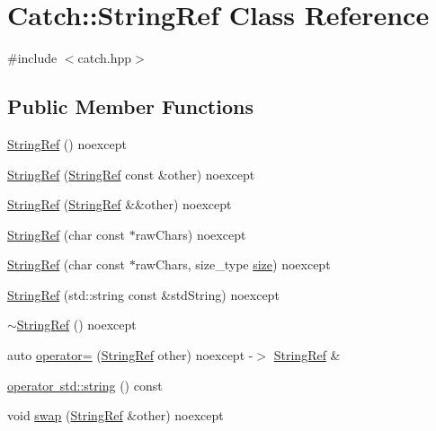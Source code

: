 \hypertarget{classCatch_1_1StringRef}{}\section{Catch\+:\+:String\+Ref Class Reference}
\label{classCatch_1_1StringRef}


{\ttfamily \#include $<$catch.\+hpp$>$}

\subsection*{Public Member Functions}
\begin{DoxyCompactItemize}
\item 
\mbox{\hyperlink{classCatch_1_1StringRef_a94319c75df6542327c93a312c6a80754}{String\+Ref}} () noexcept
\item 
\mbox{\hyperlink{classCatch_1_1StringRef_a2f287267c3a988b288bfd910667c1cfc}{String\+Ref}} (\mbox{\hyperlink{classCatch_1_1StringRef}{String\+Ref}} const \&other) noexcept
\item 
\mbox{\hyperlink{classCatch_1_1StringRef_a407d5737b94e5a374add5c2794589733}{String\+Ref}} (\mbox{\hyperlink{classCatch_1_1StringRef}{String\+Ref}} \&\&other) noexcept
\item 
\mbox{\hyperlink{classCatch_1_1StringRef_aea45f5089c53adac362bff6bd7c40943}{String\+Ref}} (char const $\ast$raw\+Chars) noexcept
\item 
\mbox{\hyperlink{classCatch_1_1StringRef_a320bf235274ebb90dd6af80485af2797}{String\+Ref}} (char const $\ast$raw\+Chars, size\+\_\+type \mbox{\hyperlink{classCatch_1_1StringRef_ae084d72cb2952cee61a63ef36611d0ad}{size}}) noexcept
\item 
\mbox{\hyperlink{classCatch_1_1StringRef_a7fe41469048f906e9a847798cd335f23}{String\+Ref}} (std\+::string const \&std\+String) noexcept
\item 
\mbox{\hyperlink{classCatch_1_1StringRef_a387795c6d883d7281befe5e82920faf8}{$\sim$\+String\+Ref}} () noexcept
\item 
auto \mbox{\hyperlink{classCatch_1_1StringRef_a6b68f1c6f37f56cee150a1b76f71926b}{operator=}} (\mbox{\hyperlink{classCatch_1_1StringRef}{String\+Ref}} other) noexcept -\/$>$ \mbox{\hyperlink{classCatch_1_1StringRef}{String\+Ref}} \&
\item 
\mbox{\hyperlink{classCatch_1_1StringRef_ad9fde21785affacc32d7da7a70d74e93}{operator std\+::string}} () const
\item 
void \mbox{\hyperlink{classCatch_1_1StringRef_a8a843e39ad3560d10a80524ed926ed63}{swap}} (\mbox{\hyperlink{classCatch_1_1StringRef}{String\+Ref}} \&other) noexcept

\end{DoxyCompactItemize}
